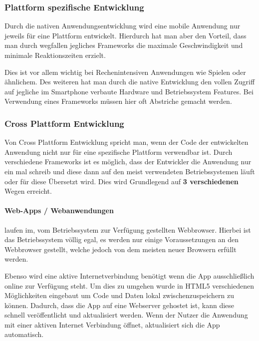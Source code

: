  
\subsubsection{Plattform spezifische Entwicklung}
Durch die nativen Anwendungsentwicklung wird eine mobile Anwendung nur jeweils für eine Plattform entwickelt. Hierdurch hat man aber den Vorteil, dass man durch wegfallen jegliches Frameworks die maximale Geschwindigkeit und minimale Reaktionszeiten erzielt.

Dies ist vor allem wichtig bei Rechenintensiven Anwendungen wie Spielen oder ähnlichem. Des weiteren hat man durch die native Entwicklung den vollen Zugriff auf jegliche im Smartphone verbaute Hardware und Betriebssystem Features. Bei Verwendung eines Frameworks müssen hier oft Abstriche gemacht werden.

\subsubsection{Cross Plattform Entwicklung}
Von Cross Plattform Entwicklung spricht man, wenn der Code der entwickelten Anwendung nicht nur für eine spezifische Plattform verwendbar ist. Durch verschiedene Frameworks ist es möglich, dass der Entwickler die Anwendung nur ein mal schreib und diese dann auf den meist verwendeten Betriebssystemen läuft oder für diese Übersetzt wird. Dies wird Grundlegend auf \textbf{3 verschiedenen} Wegen erreicht.

\paragraph{Web-Apps / Webanwendungen}laufen im, vom Betriebssystem zur Verfügung gestellten Webbrowser. Hierbei ist das Betriebssystem völlig egal, es werden nur einige Voraussetzungen an den Webbrowser gestellt, welche jedoch von dem meisten neuer Browsern erfüllt werden.

Ebenso wird eine aktive Internetverbindung benötigt wenn die App ausschließlich online zur Verfügung steht. Um dies zu umgehen wurde in HTML5 verschiedenen Möglichkeiten eingebaut um Code und Daten lokal zwischenzuspeichern zu können. Dadurch, dass die App auf eine Webserver gehostet ist, kann diese schnell veröffentlicht und aktualisiert werden. Wenn der Nutzer die Anwendung mit einer aktiven Internet Verbindung öffnet, aktualisiert sich die App automatisch. 

